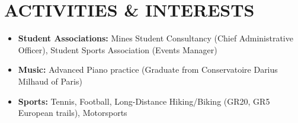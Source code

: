 \documentclass[a4paper,9pt]{extarticle}
\begin{document}
\section*{ACTIVITIES \& INTERESTS}
\begin{itemize}
    \item \textbf{Student Associations:} Mines Student Consultancy (Chief Administrative Officer), Student Sports Association (Events Manager)
    \item \textbf{Music:} Advanced Piano practice (Graduate from Conservatoire Darius Milhaud of Paris)
    \item \textbf{Sports:} Tennis, Football, Long-Distance Hiking/Biking (GR20, GR5 European trails), Motorsports
\end{itemize}

\end{document}
